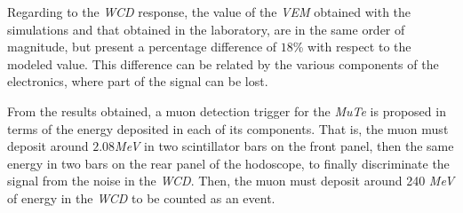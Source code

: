 \documentclass[submitting]{nst}
\begin{document}
Regarding to the \textsl{WCD} response, the value of the \textsl{VEM} obtained with the simulations and that obtained in the laboratory, are in the same order of magnitude, but present a percentage difference of $18$\% with respect to the modeled value. This difference can be related by the various components of the electronics, where part of the signal can be lost.

From the results obtained, a muon detection trigger for the \textsl{MuTe} is proposed in terms of the energy deposited in each of its components. That is, the muon must deposit around $2.08$\textsl{MeV} in two scintillator bars on the front panel, then the same energy in two bars on the rear panel of the hodoscope, to finally discriminate the signal from the noise in the \textsl{WCD}. Then, the muon must deposit around 240   \textsl{MeV}  of energy in the \textsl{WCD} to be counted as an event.





\end{document}
